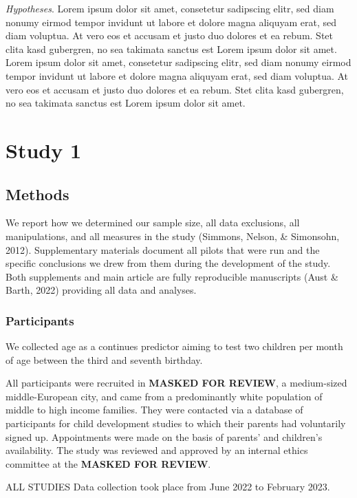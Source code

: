 \documentclass[
  man]{apa6}
\begin{document}
\emph{Hypotheses}. Lorem ipsum dolor sit amet, consetetur sadipscing elitr, sed diam nonumy eirmod tempor invidunt ut labore et dolore magna aliquyam erat, sed diam voluptua. At vero eos et accusam et justo duo dolores et ea rebum. Stet clita kasd gubergren, no sea takimata sanctus est Lorem ipsum dolor sit amet. Lorem ipsum dolor sit amet, consetetur sadipscing elitr, sed diam nonumy eirmod tempor invidunt ut labore et dolore magna aliquyam erat, sed diam voluptua. At vero eos et accusam et justo duo dolores et ea rebum. Stet clita kasd gubergren, no sea takimata sanctus est Lorem ipsum dolor sit amet.

\section{Study 1}\label{study-1}

\subsection{Methods}\label{methods}

We report how we determined our sample size, all data exclusions, all manipulations, and all measures in the study (Simmons, Nelson, \& Simonsohn, 2012). Supplementary materials document all pilots that were run and the specific conclusions we drew from them during the development of the study. Both supplements and main article are fully reproducible manuscripts (Aust \& Barth, 2022) providing all data and analyses.

\subsubsection{Participants}\label{participants}

We collected age as a continues predictor aiming to test two children per month of age between the third and seventh birthday.

All participants were recruited in \textbf{MASKED FOR REVIEW}, a medium-sized middle-European city, and came from a predominantly white population of middle to high income families. They were contacted via a database of participants for child development studies to which their parents had voluntarily signed up. Appointments were made on the basis of parents' and children's availability. The study was reviewed and approved by an internal ethics committee at the \textbf{MASKED FOR REVIEW}.

ALL STUDIES Data collection took place from June 2022 to February 2023.
\end{document}
